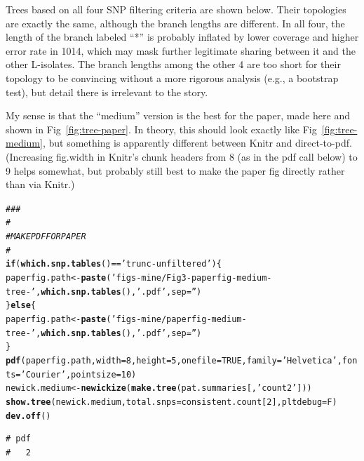 \documentclass{article}\usepackage[]{graphicx}\usepackage[]{color}
\makeatletter
\newcommand{\hlnum}[1]{\textcolor[rgb]{0.686,0.059,0.569}{#1}}%
\newcommand{\hlstr}[1]{\textcolor[rgb]{0.192,0.494,0.8}{#1}}%
\newcommand{\hlcom}[1]{\textcolor[rgb]{0.678,0.584,0.686}{\textit{#1}}}%
\newcommand{\hlopt}[1]{\textcolor[rgb]{0,0,0}{#1}}%
\newcommand{\hlstd}[1]{\textcolor[rgb]{0.345,0.345,0.345}{#1}}%
\newcommand{\hlkwa}[1]{\textcolor[rgb]{0.161,0.373,0.58}{\textbf{#1}}}%
\newcommand{\hlkwb}[1]{\textcolor[rgb]{0.69,0.353,0.396}{#1}}%
\newcommand{\hlkwc}[1]{\textcolor[rgb]{0.333,0.667,0.333}{#1}}%
\newcommand{\hlkwd}[1]{\textcolor[rgb]{0.737,0.353,0.396}{\textbf{#1}}}%
\newenvironment{kframe}{%
 \def\at@end@of@kframe{}%
 \ifinner\ifhmode%
  \def\at@end@of@kframe{\end{minipage}}%
  \begin{minipage}{\columnwidth}%
 \fi\fi%
 \def\FrameCommand##1{\hskip\@totalleftmargin \hskip-\fboxsep
 \colorbox{shadecolor}{##1}\hskip-\fboxsep
     \hskip-\linewidth \hskip-\@totalleftmargin \hskip\columnwidth}%
 \MakeFramed {\advance\hsize-\width
   \@totalleftmargin\z@ \linewidth\hsize
   \@setminipage}}%
 {\par\unskip\endMakeFramed%
 \at@end@of@kframe}
\newenvironment{knitrout}{}{} %
\makeatother
\begin{document}
Trees based on all four SNP filtering criteria are shown below.  Their topologies are exactly the
same, although the branch lengths are different.  In all four, the length of the branch labeled ``*'' is probably
inflated by lower coverage and higher error rate in 1014, which may mask further legitimate sharing between it and the
other L-isolates.  The branch lengths among the other 4 are too short for their topology to be convincing without a
more rigorous analysis (e.g., a bootstrap test), but detail there is irrelevant to the story.

My sense is that the ``medium'' version is the best for the paper, made here and shown in 
Fig~\ref{fig:tree-paper}.  In theory, this should look exactly like Fig~\ref{fig:tree-medium}, but 
something is apparently different between Knitr and direct-to-pdf.  (Increasing fig.width in Knitr's 
chunk headers from 8 (as in the pdf call below) to 9 helps somewhat, but probably still best to make 
the paper fig directly rather than via Knitr.)

\begin{knitrout}\scriptsize
{}\color{fgcolor}\begin{kframe}
\begin{alltt}
\hlcom{###}
\hlcom{#}
\hlcom{# MAKE PDF FOR PAPER}
\hlcom{#}
\hlkwa{if}\hlstd{(}\hlkwd{which.snp.tables}\hlstd{()} \hlopt{==} \hlstr{'trunc-unfiltered'}\hlstd{)\{}
  \hlstd{paperfig.path} \hlkwb{<-} \hlkwd{paste}\hlstd{(}\hlstr{'figs-mine/Fig3-paperfig-medium-tree-'}\hlstd{,} \hlkwd{which.snp.tables}\hlstd{(),} \hlstr{'.pdf'}\hlstd{,} \hlkwc{sep}\hlstd{=}\hlstr{''}\hlstd{)}
\hlstd{\}} \hlkwa{else} \hlstd{\{}
  \hlstd{paperfig.path} \hlkwb{<-} \hlkwd{paste}\hlstd{(}\hlstr{'figs-mine/paperfig-medium-tree-'}\hlstd{,} \hlkwd{which.snp.tables}\hlstd{(),} \hlstr{'.pdf'}\hlstd{,} \hlkwc{sep}\hlstd{=}\hlstr{''}\hlstd{)}
\hlstd{\}}
\hlkwd{pdf}\hlstd{(paperfig.path,} \hlkwc{width}\hlstd{=}\hlnum{8}\hlstd{,}\hlkwc{height}\hlstd{=}\hlnum{5}\hlstd{,}\hlkwc{onefile}\hlstd{=}\hlnum{TRUE}\hlstd{,}\hlkwc{family}\hlstd{=}\hlstr{'Helvetica'}\hlstd{,}\hlkwc{fonts}\hlstd{=}\hlstr{'Courier'}\hlstd{,}\hlkwc{pointsize}\hlstd{=}\hlnum{10}\hlstd{)}
\hlstd{newick.medium} \hlkwb{<-} \hlkwd{newickize}\hlstd{(}\hlkwd{make.tree}\hlstd{(pat.summaries[,}\hlstr{'count2'}\hlstd{]))}
\hlkwd{show.tree}\hlstd{(newick.medium,} \hlkwc{total.snps}\hlstd{=consistent.count[}\hlnum{2}\hlstd{],} \hlkwc{pltdebug}\hlstd{=F)}
\hlkwd{dev.off}\hlstd{()}
\end{alltt}
\begin{verbatim}
# pdf 
#   2
\end{verbatim}
\end{kframe}
\end{knitrout}
\end{document}
